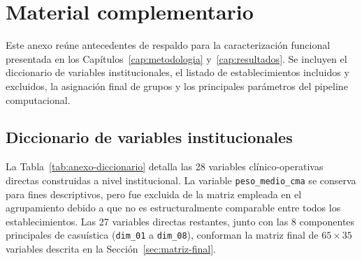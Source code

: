 
\chapter{Material complementario}
\label{anexo:complementario}

Este anexo reúne antecedentes de respaldo para la caracterización funcional
presentada en los Capítulos~\ref{cap:metodologia} y~\ref{cap:resultados}. Se
incluyen el diccionario de variables institucionales, el listado de
establecimientos incluidos y excluidos, la asignación final de grupos y los
principales parámetros del pipeline computacional.

\section{Diccionario de variables institucionales}
\label{anexo:diccionario}

La Tabla~\ref{tab:anexo-diccionario} detalla las 28 variables
clínico-operativas directas construidas a nivel institucional. La variable
\texttt{peso\_medio\_cma} se conserva para fines descriptivos, pero fue excluida
de la matriz empleada en el agrupamiento debido a que no es estructuralmente
comparable entre todos los establecimientos. Las 27 variables directas restantes,
junto con las 8 componentes principales de casuística
(\texttt{dim\_01} a \texttt{dim\_08}), conforman la matriz final de
$65 \times 35$ variables descrita en la Sección~\ref{sec:matriz-final}.

